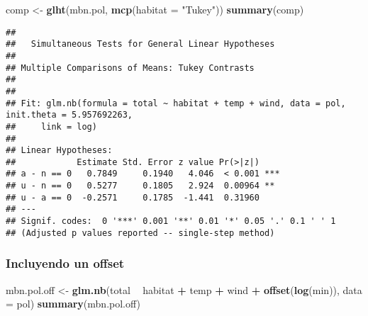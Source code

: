 \documentclass[
]{book}
\newenvironment{Shaded}{\begin{snugshade}}{\end{snugshade}}
\newcommand{\DataTypeTok}[1]{\textcolor[rgb]{0.13,0.29,0.53}{#1}}
\newcommand{\KeywordTok}[1]{\textcolor[rgb]{0.13,0.29,0.53}{\textbf{#1}}}
\newcommand{\NormalTok}[1]{#1}
\newcommand{\OperatorTok}[1]{\textcolor[rgb]{0.81,0.36,0.00}{\textbf{#1}}}
\newcommand{\StringTok}[1]{\textcolor[rgb]{0.31,0.60,0.02}{#1}}
\begin{document}
\begin{Shaded}
\begin{Highlighting}[]
\NormalTok{comp <-}\StringTok{ }\KeywordTok{glht}\NormalTok{(mbn.pol, }\KeywordTok{mcp}\NormalTok{(}\DataTypeTok{habitat =} \StringTok{"Tukey"}\NormalTok{)) }
\KeywordTok{summary}\NormalTok{(comp) }
\end{Highlighting}
\end{Shaded}

\begin{verbatim}
## 
##   Simultaneous Tests for General Linear Hypotheses
## 
## Multiple Comparisons of Means: Tukey Contrasts
## 
## 
## Fit: glm.nb(formula = total ~ habitat + temp + wind, data = pol, init.theta = 5.957692263, 
##     link = log)
## 
## Linear Hypotheses:
##            Estimate Std. Error z value Pr(>|z|)    
## a - n == 0   0.7849     0.1940   4.046  < 0.001 ***
## u - n == 0   0.5277     0.1805   2.924  0.00964 ** 
## u - a == 0  -0.2571     0.1785  -1.441  0.31960    
## ---
## Signif. codes:  0 '***' 0.001 '**' 0.01 '*' 0.05 '.' 0.1 ' ' 1
## (Adjusted p values reported -- single-step method)
\end{verbatim}

\hypertarget{incluyendo-un-offset}{%
\subsubsection{Incluyendo un offset}\label{incluyendo-un-offset}}

\begin{Shaded}
\begin{Highlighting}[]
\NormalTok{mbn.pol.off <-}\StringTok{ }\KeywordTok{glm.nb}\NormalTok{(total }\OperatorTok{~}\StringTok{ }\NormalTok{habitat }\OperatorTok{+}\StringTok{ }\NormalTok{temp }\OperatorTok{+}\StringTok{ }\NormalTok{wind }\OperatorTok{+}\StringTok{ }\KeywordTok{offset}\NormalTok{(}\KeywordTok{log}\NormalTok{(min)), }\DataTypeTok{data =}\NormalTok{ pol)}
\KeywordTok{summary}\NormalTok{(mbn.pol.off)}
\end{Highlighting}
\end{Shaded}
\end{document}
